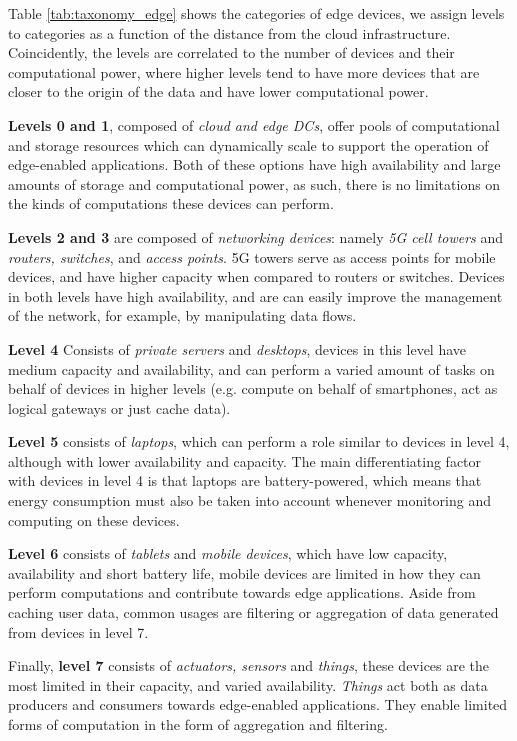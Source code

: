 Table \ref{tab:taxonomy_edge} shows the categories of edge devices, we assign levels to categories as a function of the distance from the cloud infrastructure. Coincidently, the levels are correlated to the number of devices and their computational power, where higher levels tend to have more devices that are closer to the origin of the data and have lower computational power.

\textbf{Levels 0 and 1}, composed of \textit{cloud and edge DCs}, offer pools of computational and storage resources which can dynamically scale to support the operation of edge-enabled applications. Both of these options have high availability and large amounts of storage and computational power, as such, there is no limitations on the kinds of computations these devices can perform.

\textbf{Levels 2 and 3} are composed of \textit{networking devices}: namely 
\textit{5G cell towers} and \textit{routers, switches}, and \textit{access points}. 5G towers serve as access points for mobile devices, and have higher capacity when compared to routers or switches. Devices in both levels have high availability, and are can easily improve the management of the network, for example, by manipulating data flows.

\textbf{Level 4} Consists of \textit{private servers} and \textit{desktops}, devices in this level have medium capacity and availability, and can perform a varied amount of tasks on behalf of devices in higher levels (e.g. compute on behalf of smartphones, act as logical gateways or just cache data). 

\textbf{Level 5} consists of \textit{laptops}, which can perform a role similar to devices in level 4, although with lower availability and capacity. The main differentiating factor with devices in level 4 is that laptops are battery-powered, which means that energy consumption must also be taken into account whenever monitoring and computing on these devices. 

\textbf{Level 6} consists of \textit{tablets} and \textit{mobile devices}, which have low capacity, availability and short battery life, mobile devices are limited in how they can perform computations and contribute towards edge applications. Aside from caching user data, common usages are filtering or aggregation of data generated from devices in level 7. 

Finally, \textbf{level 7} consists of \textit{actuators, sensors} and \textit{things}, these devices are the most limited in their capacity, and varied availability. \textit{Things} act both as data producers and consumers towards edge-enabled applications. They enable limited forms of computation in the form of aggregation and filtering.


